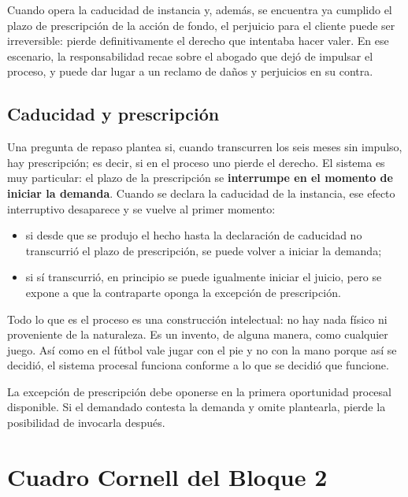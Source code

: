 \documentclass[12pt,oneside]{book}
\begin{document}
\begin{important}
Cuando opera la caducidad de instancia y, además, se encuentra ya cumplido el plazo de prescripción de la acción de fondo, el perjuicio para el cliente puede ser irreversible: pierde definitivamente el derecho que intentaba hacer valer. En ese escenario, la responsabilidad recae sobre el abogado que dejó de impulsar el proceso, y puede dar lugar a un reclamo de daños y perjuicios en su contra.
\end{important}

\subsection{Caducidad y prescripción}

Una pregunta de repaso plantea si, cuando transcurren los seis meses sin impulso, hay prescripción; es decir, si en el proceso uno pierde el derecho. El sistema es muy particular: el plazo de la prescripción se \textbf{interrumpe en el momento de iniciar la demanda}. Cuando se declara la caducidad de la instancia, ese efecto interruptivo desaparece y se vuelve al primer momento:

\begin{itemize}
    \item si desde que se produjo el hecho hasta la declaración de caducidad no transcurrió el plazo de prescripción, se puede volver a iniciar la demanda;
    \item si sí transcurrió, en principio se puede igualmente iniciar el juicio, pero se expone a que la contraparte oponga la excepción de prescripción.
\end{itemize}

\begin{note}
Todo lo que es el proceso es una construcción intelectual: no hay nada físico ni proveniente de la naturaleza. Es un invento, de alguna manera, como cualquier juego. Así como en el fútbol vale jugar con el pie y no con la mano porque así se decidió, el sistema procesal funciona conforme a lo que se decidió que funcione.
\end{note}

\begin{important}
La excepción de prescripción debe oponerse en la primera oportunidad procesal disponible. Si el demandado contesta la demanda y omite plantearla, pierde la posibilidad de invocarla después.
\end{important}

\clearpage
\section{Cuadro Cornell del Bloque 2}
\end{document}
